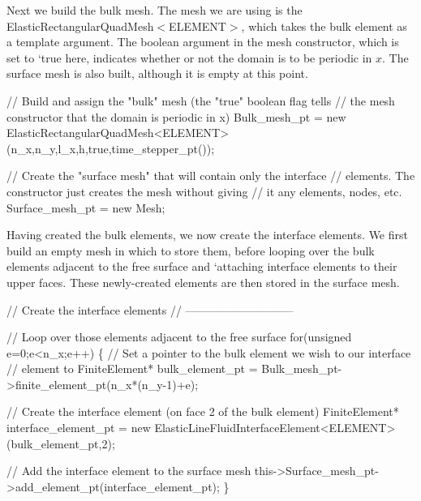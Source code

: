 Next we build the bulk mesh. The mesh we are using is the {\ttfamily Elastic\+Rectangular\+Quad\+Mesh$<$\+E\+L\+E\+M\+E\+N\+T$>$}, which takes the bulk element as a template argument. The boolean argument in the mesh constructor, which is set to `true\textquotesingle{} here, indicates whether or not the domain is to be periodic in $ x $. The surface mesh is also built, although it is empty at this point.


\begin{DoxyCodeInclude}
 \textcolor{comment}{// Build and assign the "bulk" mesh (the "true" boolean flag tells}
 \textcolor{comment}{// the mesh constructor that the domain is periodic in x)}
 Bulk\_mesh\_pt = \textcolor{keyword}{new} ElasticRectangularQuadMesh<ELEMENT>
  (n\_x,n\_y,l\_x,h,\textcolor{keyword}{true},time\_stepper\_pt());

 \textcolor{comment}{// Create the "surface mesh" that will contain only the interface}
 \textcolor{comment}{// elements. The constructor just creates the mesh without giving}
 \textcolor{comment}{// it any elements, nodes, etc.}
 Surface\_mesh\_pt = \textcolor{keyword}{new} Mesh;

\end{DoxyCodeInclude}


Having created the bulk elements, we now create the interface elements. We first build an empty mesh in which to store them, before looping over the bulk elements adjacent to the free surface and `attaching\textquotesingle{} interface elements to their upper faces. These newly-\/created elements are then stored in the surface mesh.


\begin{DoxyCodeInclude}
 \textcolor{comment}{// Create the interface elements}
 \textcolor{comment}{// -----------------------------}

 \textcolor{comment}{// Loop over those elements adjacent to the free surface}
 \textcolor{keywordflow}{for}(\textcolor{keywordtype}{unsigned} e=0;e<n\_x;e++)
  \{
   \textcolor{comment}{// Set a pointer to the bulk element we wish to our interface}
   \textcolor{comment}{// element to}
   FiniteElement* bulk\_element\_pt =
    Bulk\_mesh\_pt->finite\_element\_pt(n\_x*(n\_y-1)+e);

   \textcolor{comment}{// Create the interface element (on face 2 of the bulk element)}
   FiniteElement* interface\_element\_pt =
    \textcolor{keyword}{new} ElasticLineFluidInterfaceElement<ELEMENT>(bulk\_element\_pt,2);

   \textcolor{comment}{// Add the interface element to the surface mesh}
   this->Surface\_mesh\_pt->add\_element\_pt(interface\_element\_pt);
  \}

\end{DoxyCodeInclude}


